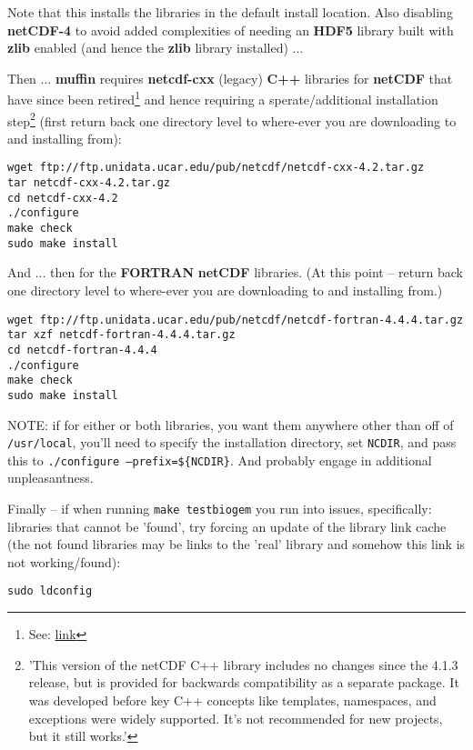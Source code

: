 \documentclass[11pt,fleqn]{book} %
\begin{document}
\begin{enumerate}[noitemsep]
Note that this installs the libraries in the default install location. Also disabling \textbf{netCDF-4} to avoid added complexities of needing an \textbf{HDF5} library built with \textbf{zlib} enabled (and hence the \textbf{zlib} library installed) ...

Then ... \textbf{muffin} requires \textbf{netcdf-cxx} (legacy) \textbf{C++} libraries for \textbf{netCDF} that have since been retired\footnote{See: \href{https://www.unidata.ucar.edu/support/help/MailArchives/netcdf/msg12236.html}{link}} and hence requiring a sperate/additional installation step\footnote{'This version of the netCDF C++ library includes no changes since the 4.1.3 release, but is provided for backwards compatibility as a separate package. It was developed before key C++ concepts like templates, namespaces, and exceptions were widely supported. It's not recommended for new projects, but it still works.'} (first return back one directory level to where-ever you are downloading to and installing from):

\begin{verbatim}
wget ftp://ftp.unidata.ucar.edu/pub/netcdf/netcdf-cxx-4.2.tar.gz
tar netcdf-cxx-4.2.tar.gz
cd netcdf-cxx-4.2
./configure
make check
sudo make install
\end{verbatim}

And ... then for the \textbf{FORTRAN} \textbf{netCDF} libraries. (At this point -- return back one directory level to where-ever you are downloading to and installing from.)

\begin{verbatim}
wget ftp://ftp.unidata.ucar.edu/pub/netcdf/netcdf-fortran-4.4.4.tar.gz
tar xzf netcdf-fortran-4.4.4.tar.gz
cd netcdf-fortran-4.4.4
./configure
make check
sudo make install
\end{verbatim}

NOTE: if for either or both libraries, you want them anywhere other than off of \texttt{/usr/local}, you'll need to specify the installation directory, set \texttt{NCDIR}, and pass this to \texttt{./configure --prefix=\$\{NCDIR\}}. And probably engage in additional unpleasantness.

Finally -- if when running \texttt{make testbiogem} you run into issues, specifically: libraries that cannot be 'found', try forcing an update of the library link cache (the not found libraries may be links to the 'real' library and somehow this link is not working/found):

\begin{verbatim}
sudo ldconfig
\end{verbatim}


\end{enumerate}
\end{document}
